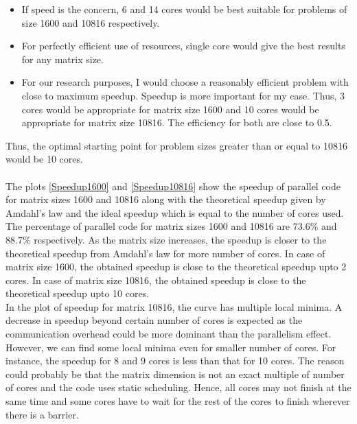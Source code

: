 \documentclass{article}
\begin{document}
\begin{spacing}{1.1}
\begin{itemize}
    \item If speed is the concern, 6 and 14 cores would be best suitable for problems of size 1600 and 10816 respectively. 
    \item For perfectly efficient use of resources, single core would give the best results for any matrix size.
    \item For our research purposes, I would choose a reasonably efficient problem with close to maximum speedup. Speedup is more important for my case. Thus, 3 cores would be appropriate for matrix size 1600 and 10 cores would be appropriate for matrix size 10816. The efficiency for both are close to 0.5.
\end{itemize}
Thus, the optimal starting point for problem sizes greater than or equal to 10816 would be 10 cores. \\
\\
The plots \ref{Speedup1600} and \ref{Speedup10816} show the speedup of parallel code for matrix sizes 1600 and 10816 along with the theoretical speedup given by Amdahl's law and the ideal speedup which is equal to the number of cores used. The percentage of parallel code for matrix sizes 1600 and 10816 are 73.6\%  and 88.7\% respectively. As the matrix size increases, the speedup is closer to the theoretical speedup from Amdahl's law for more number of cores. In case of matrix size 1600, the obtained speedup is close to the theoretical speedup upto 2 cores. In case of matrix size 10816, the obtained speedup is close to the theoretical speedup upto 10 cores. \\
In the plot of speedup for matrix 10816, the curve has multiple local minima. A decrease in speedup beyond certain number of cores is expected as the communication overhead could be more dominant than the parallelism effect. However, we can find some local minima even for smaller number of cores. For instance, the speedup for 8 and 9 cores is less than that for 10 cores. The reason could probably be that the matrix dimension is not an exact multiple of number of cores and the code uses static scheduling. Hence, all cores may not finish at the same time and some cores have to wait for the rest of the cores to finish wherever there is a barrier.


\end{spacing}
\end{document}
